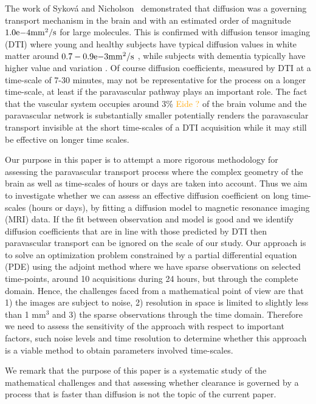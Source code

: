 \documentclass[11pt,a4paper]{article}
\newcommand{\fixme}[1]{\textcolor{orange}{#1}}
\begin{document}
The work of Sykov{\'a} and Nicholson~\cite{sykova2008diffusion} demonstrated
that diffusion was a governing transport mechanism in the brain and with an estimated order of magnitude $1.0\mathrm{e}{-4} \mathrm{mm\sp{2}/s}$ for large molecules. This is confirmed with diffusion tensor imaging (DTI) where young and healthy subjects have typical diffusion values in white matter around $0.7-0.9\mathrm{e}{-3} \mathrm{mm\sp{2}/s}$ \citet{Helenius194},
while subjects with dementia typically have higher value and variation \cite{goujon2018can} . Of course diffusion coefficients, 
measured by DTI at a time-scale of 7-30 minutes, may not be representative for the process on a
longer time-scale, at least if the paravascular pathway plays an important role. The fact that the vascular system occupies around 3\% \fixme{Eide ? } of the brain volume 
and the paravascular network is substantially smaller potentially renders the paravascular transport  invisible at the short time-scales of a DTI acquisition while it may still be effective on longer time scales. 


Our purpose in this paper is to attempt a more rigorous methodology 
for assessing the paravascular transport process where
the complex geometry of the brain as well as time-scales of hours or days are taken into account.
Thus we aim to investigate whether we can assess an effective diffusion coefficient on long time-scales (hours or days), by fitting a diffusion model to magnetic resonance imaging (MRI) data. If the fit between observation and model is good and we identify diffusion coefficients that are 
in line with those predicted by DTI then paravascular transport can be ignored on the scale of our study. 
Our approach is to solve an optimization problem constrained by a partial differential equation (PDE) using the adjoint method where we have sparse observations on selected time-points, around 10 acquisitions during 24 hours, but through
the complete domain. Hence, the challenges faced from a mathematical point of view 
are that 1) the images are subject to noise, 2) resolution in space is limited to slightly less than 1 $\mathrm{mm}^3$ and 3)
the sparse observations through the time domain. 
Therefore we need to assess the sensitivity of the approach with respect to important factors, such noise levels and time resolution to determine whether this approach is a viable method to obtain parameters involved time-scales. 

We remark that the purpose
of this paper is a systematic study of the mathematical challenges and that assessing  
whether clearance is governed by a process that is faster than diffusion is not the topic of the current paper. 
\end{document}
